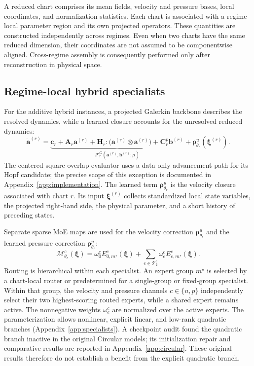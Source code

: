 \documentclass{article}
\begin{document}
A reduced chart comprises its mean fields, velocity and pressure bases, local coordinates, and normalization statistics. Each chart is associated with a regime-local parameter region and its own projected operators.
These quantities are constructed independently across regimes. Even when two charts have the same reduced dimension, their coordinates are not assumed to be componentwise aligned. Cross-regime assembly is consequently performed only after reconstruction in physical space.

\subsection{Regime-local hybrid specialists}

For the additive hybrid instances, a projected Galerkin backbone describes the resolved dynamics, while a learned closure accounts for the unresolved reduced dynamics:
\begin{equation}
  \dot{\bm a}^{(r)}=
  \underbrace{\bm c_r+\bm A_r\bm a^{(r)}+
  \bm H_r:\bigl(\bm a^{(r)}\otimes\bm a^{(r)}\bigr)+
  \bm C^p_r\bm b^{(r)}}_{\mathcal F_r^{G}(\bm a^{(r)},\bm b^{(r)};\mu)}
  +\bm\rho^u_{\theta_r}(\bm\xi^{(r)}).
  \label{eq:main_specialist}
\end{equation}
The centered-square overlap evaluator uses a data-only advancement path for its Hopf candidate; the precise scope of this exception is documented in Appendix~\ref{app:implementation}. The learned term $\bm\rho^u_{\theta_r}$ is the velocity closure associated with chart $r$. Its input $\bm\xi^{(r)}$ collects standardized local state variables, the projected right-hand side, the physical parameter, and a short history of preceding states.

Separate sparse MoE maps are used for the velocity correction $\bm\rho^u_{\theta_r}$ and the learned pressure correction $\bm\rho^p_{\theta_r}$:
\begin{equation}
  \mathcal M^c_{\theta_r}(\bm\xi)=
  \omega^c_0 E^c_{0,m^\star}(\bm\xi)+
  \sum_{e\in\mathcal T_2^c}\omega^c_e E^c_{e,m^\star}(\bm\xi).
  \label{eq:main_inner_moe}
\end{equation}
Routing is hierarchical within each specialist. An expert group $m^\star$ is selected by a chart-local router or predetermined for a single-group or fixed-group specialist. Within that group, the velocity and pressure channels $c\in\{u,p\}$ independently select their two highest-scoring routed experts, while a shared expert remains active. The nonnegative weights $\omega_e^c$ are normalized over the active experts. The parameterization allows nonlinear, explicit linear, and low-rank quadratic branches (Appendix~\ref{app:specialists}). A checkpoint audit found the quadratic branch inactive in the original Circular models; its initialization repair and comparative results are reported in Appendix~\ref{app:circular}. These original results therefore do not establish a benefit from the explicit quadratic branch.
\end{document}

